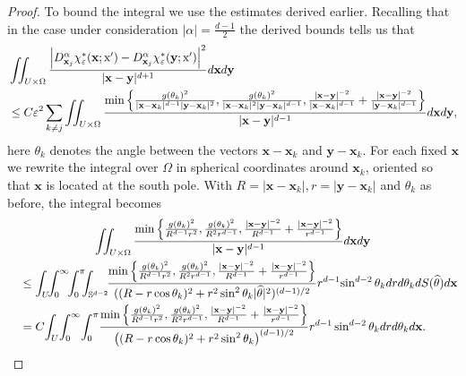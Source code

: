 \documentclass[AHL, Unicode, longabstracts, published]{cedram}
\newcommand*\eps{\varepsilon}
\renewcommand*\S {\mathbb{S}}
\newcommand\1{{\ensuremath {\mathds 1} }}
\newcommand{\bx}{\mathbf{x}}
\newcommand{\by}{\mathbf{y}}
\newcommand{\sx}{\textup{x}}
\renewcommand*{\hat}[1]{\mathchoice{\widehat{#1}}{\widehat{#1}}{\oldhat{#1}}{\oldhat{#1}}}\let\oldforall\forall
\renewcommand*{\forall}{\mathrel{\oldforall}}
\begin{document}
\begin{proof}
To bound the integral we use the estimates derived earlier. Recalling that in the case under consideration $|\alpha|= \frac{d-1}{2}$ the derived bounds tells us that
\begin{align*}
&\iint_{U\times \Omega}\frac{\left|D_{\bx_j}^\alpha\chi_\eps^*(\bx; \sx')-D_{\bx_j}^\alpha\chi_\eps^*(\by; \sx')\right|^2}{|\bx-\by|^{d+1}}d\bx d\by\\
&\leq C \eps^2\sum_{k\neq j}
\iint_{U\times \Omega}
\frac{\min\left\{
\frac{g(\theta_k)^{2}}{|\bx-\bx_k|^{d-1}|\by-\bx_k|^{2}},
\frac{g(\theta_k)^{2}}{|\bx-\bx_k|^{2}|\by-\bx_k|^{d-1}},
\frac{|\bx-\by|^{-2}}{|\bx-\bx_k|^{d-1}} +\frac{|\bx-\by|^{-2}}{|\by-\bx_k|^{d-1}}\right\}}{|\bx-\by|^{d-1}}d\bx d\by,
\end{align*}
here $\theta_k$ denotes the angle between the vectors $\bx-\bx_k$ and $\by-\bx_k$. For each fixed $\bx$ we rewrite the integral over $\Omega$ in spherical coordinates around $\bx_k$, oriented so that $\bx$ is located at the south pole. With $R=|\bx-\bx_k|, r=|\by-\bx_k|$ and $\theta_k$ as before, the integral becomes
\begin{multline*}
\iint_{U\times\Omega}\frac{\min\left\{
\frac{g(\theta_k)^{2}}{R^{d-1}r^{2}},
\frac{g(\theta_k)^{2}}{R^{2}r^{d-1}},
\frac{|\bx-\by|^{-2}}{R^{d-1}}+
\frac{|\bx-\by|^{-2}}{r^{d-1}}\right\}}{|\bx-\by|^{d-1}}d\bx d\by\\
\begin{aligned}
&\quad\leq
\int_U\!\!\int_0^{\infty}\!\!\int_0^\pi\!\!\!\int_{\S^{d-2}}
\!\!\frac{
\min\left\{
\frac{g(\theta_k)^{2}}{R^{d-1}r^{2}},
\frac{g(\theta_k)^{2}}{R^{2}r^{d-1}},
\frac{|\bx-\by|^{-2}}{R^{d-1}} +\frac{|\bx-\by|^{-2}}{r^{d-1}}
\right\}} {((R-r \cos\theta_k)^2+r^2\sin^2 \theta_k |\hat\theta|^2)^{(d-1)/2}} r^{d-1}\!\sin^{d-2}\theta_k dr d\theta_k d S(\hat\theta) d\bx\\
&\quad= C\!\int_U\!\int_0^{\infty}\!\int_0^\pi\!
\frac{
\min\left\{
\frac{g(\theta_k)^{2}}{R^{d-1}r^{2}},
\frac{g(\theta_k)^{2}}{R^{2}r^{d-1}},
\frac{|\bx-\by|^{-2}}{R^{d-1}}+
\frac{|\bx-\by|^{-2}}{r^{d-1}}
\right\}} {\left((R-r \cos\theta_k)^2+r^2\sin^2 \theta_k\right)^{(d-1)/2}} r^{d-1}\sin^{d-2}\theta_k dr d\theta_k d\bx.
\end{aligned}
\end{multline*}


\end{proof}
\end{document}
